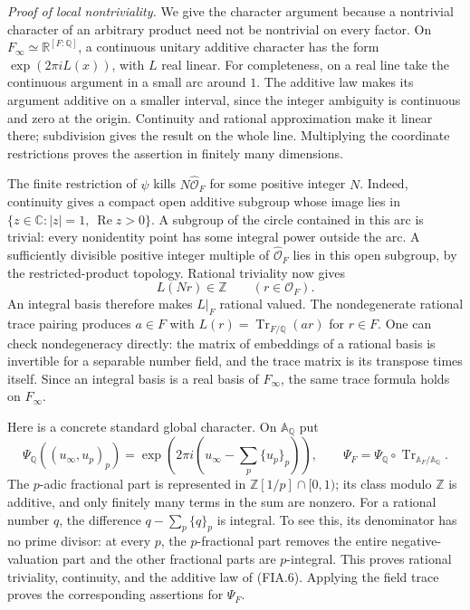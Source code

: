 \emph{Proof of local nontriviality.}
We give the character argument because a nontrivial character of
an arbitrary product need not be nontrivial on every factor.
On \(F_\infty\simeq\mathbb R^{[F:\mathbb Q]}\), a continuous unitary
additive character has the form
\(\exp(2\pi iL(x))\), with \(L\) real linear.
For completeness, on a real line take the continuous argument in
a small arc around \(1\).  The additive law makes its argument
additive on a smaller interval, since the integer ambiguity is
continuous and zero at the origin.  Continuity and rational
approximation make it linear there; subdivision gives the result
on the whole line.  Multiplying the coordinate restrictions proves
the assertion in finitely many dimensions.

The finite restriction of \(\psi\) kills \(N\widehat{\mathcal O}_F\)
for some positive integer \(N\).  Indeed, continuity gives a
compact open additive subgroup whose image lies in
\(\{z\in\mathbb C:|z|=1,\ \operatorname{Re}z>0\}\).
A subgroup of the circle contained in this arc is trivial:
every nonidentity point has some integral power outside the arc.
A sufficiently divisible positive integer multiple of
\(\widehat{\mathcal O}_F\) lies in this open subgroup, by the
restricted-product topology.  Rational triviality now gives
\[
            L(Nr)\in\mathbb Z\qquad(r\in\mathcal O_F).
 \tag{FIA.5}
\]
An integral basis therefore makes \(L|_F\) rational valued.
The nondegenerate rational trace pairing produces \(a\in F\)
with \(L(r)=\operatorname{Tr}_{F/\mathbb Q}(ar)\) for \(r\in F\).
One can check nondegeneracy directly: the matrix of embeddings
of a rational basis is invertible for a separable number field,
and the trace matrix is its transpose times itself.  Since an
integral basis is a real basis of \(F_\infty\), the same trace
formula holds on \(F_\infty\).

Here is a concrete standard global character.  On \(\mathbb A_\mathbb Q\)
put
\[
 \Psi_\mathbb Q((u_\infty,u_p)_p)
   =\exp\!\left(2\pi i
             \left(u_\infty-\sum_p\{u_p\}_p\right)\right),
 \qquad
 \Psi_F=\Psi_\mathbb Q\circ
                  \operatorname{Tr}_{\mathbb A_F/\mathbb A_\mathbb Q}.
 \tag{FIA.6}
\]
The \(p\)-adic fractional part is represented in
\(\mathbb Z[1/p]\cap[0,1)\); its class modulo \(\mathbb Z\) is
additive, and only finitely many terms in the sum are nonzero.
For a rational number \(q\), the difference
\(q-\sum_p\{q\}_p\) is integral.  To see this, its denominator
has no prime divisor: at every \(p\), the \(p\)-fractional part
removes the entire negative-valuation part and the other
fractional parts are \(p\)-integral.  This proves rational
triviality, continuity, and the additive law of (FIA.6).
Applying the field trace proves the corresponding assertions
for \(\Psi_F\).

